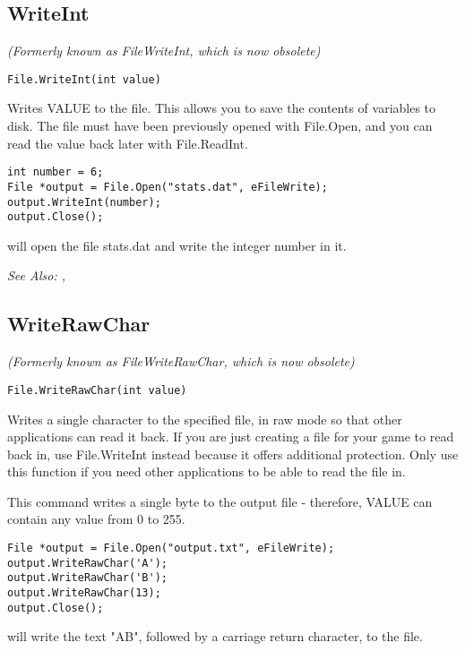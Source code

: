 \subsection{WriteInt}\label{File.WriteInt}%

\it{(Formerly known as FileWriteInt, which is now obsolete)}

\begin{verbatim}
File.WriteInt(int value)
\end{verbatim}
Writes VALUE to the file. This allows you to save the contents of
variables to disk. The file must have been previously opened with File.Open,
and you can read the value back later with File.ReadInt.

\begin{verbatim}
int number = 6;
File *output = File.Open("stats.dat", eFileWrite);
output.WriteInt(number);
output.Close();
\end{verbatim}
will open the file stats.dat and write the integer number in it.

\it{See Also:} , 


\subsection{WriteRawChar}\label{File.WriteRawChar}%

\it{(Formerly known as FileWriteRawChar, which is now obsolete)}

\begin{verbatim}
File.WriteRawChar(int value)
\end{verbatim}
Writes a single character to the specified file, in raw mode so that other
applications can read it back. If you are just creating a file for your
game to read back in, use File.WriteInt instead because it offers additional
protection. Only use this function if you need other applications to be
able to read the file in.

This command writes a single byte to the output file - therefore, VALUE can
contain any value from 0 to 255.

\begin{verbatim}
File *output = File.Open("output.txt", eFileWrite);
output.WriteRawChar('A');
output.WriteRawChar('B');
output.WriteRawChar(13);
output.Close();
\end{verbatim}
will write the text "AB", followed by a carriage return character, to the file.

